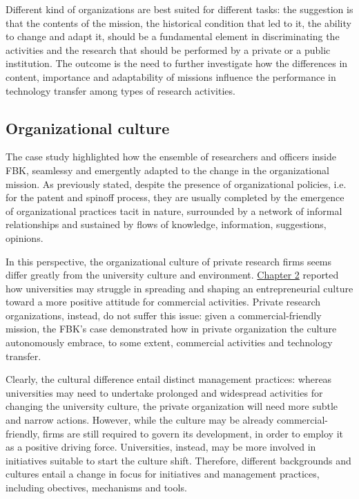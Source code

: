 Different kind of organizations are best suited for different tasks: the suggestion is that the contents of the mission, the historical condition that led to it, the ability to change and adapt it, should be a fundamental element in discriminating the activities and the research that should be performed by a private or a public institution. The outcome is the need to further investigate how the differences in content, importance and adaptability of missions influence the performance in technology transfer among types of research activities.

\subsection{Organizational culture}

The case study highlighted how the ensemble of researchers and officers inside FBK, seamlessy and emergently adapted to the change in the organizational mission. As previously stated, despite the presence of organizational policies, i.e. for the patent and spinoff process, they are usually completed by the emergence of organizational practices tacit in nature, surrounded by a network of informal relationships and sustained by flows of knowledge, information, suggestions, opinions. 

In this perspective, the organizational culture of private research firms seems differ greatly from the university culture and environment. \hyperref[Chapter2]{Chapter 2} reported how universities may struggle in spreading and shaping an entrepreneurial culture toward a more positive attitude for commercial activities. Private research organizations, instead, do not suffer this issue: given a commercial-friendly mission, the FBK's case demonstrated how in private organization the culture autonomously embrace, to some extent, commercial activities and technology transfer. 

Clearly, the cultural difference entail distinct management practices: whereas universities may need to undertake prolonged and widespread activities for changing the university culture, the private organization will need more subtle and narrow actions. However, while the culture may be already commercial-friendly, firms are still required to govern its development, in order to employ it as a positive driving force. Universities, instead, may be more involved in initiatives suitable to start the culture shift. Therefore, different backgrounds and cultures entail a change in focus for initiatives and management practices, including obectives, mechanisms and tools.

